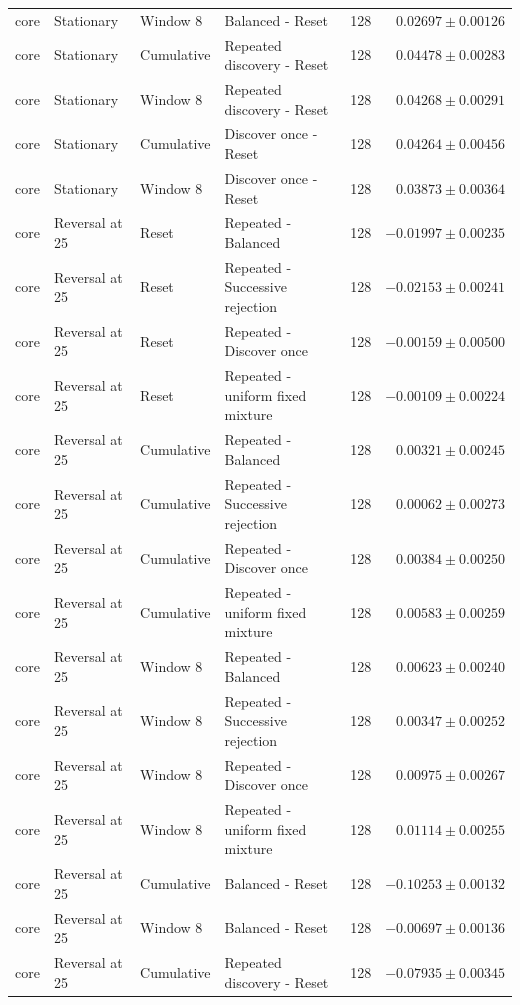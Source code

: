 \begin{longtable}{@{}lp{.19\linewidth}lp{.29\linewidth}rr@{}}
core & Stationary & Window 8 & Balanced - Reset & 128 & $0.02697 \pm 0.00126$ \\
core & Stationary & Cumulative & Repeated discovery - Reset & 128 & $0.04478 \pm 0.00283$ \\
core & Stationary & Window 8 & Repeated discovery - Reset & 128 & $0.04268 \pm 0.00291$ \\
core & Stationary & Cumulative & Discover once - Reset & 128 & $0.04264 \pm 0.00456$ \\
core & Stationary & Window 8 & Discover once - Reset & 128 & $0.03873 \pm 0.00364$ \\
core & Reversal at 25 & Reset & Repeated - Balanced & 128 & $-0.01997 \pm 0.00235$ \\
core & Reversal at 25 & Reset & Repeated - Successive rejection & 128 & $-0.02153 \pm 0.00241$ \\
core & Reversal at 25 & Reset & Repeated - Discover once & 128 & $-0.00159 \pm 0.00500$ \\
core & Reversal at 25 & Reset & Repeated - uniform fixed mixture & 128 & $-0.00109 \pm 0.00224$ \\
core & Reversal at 25 & Cumulative & Repeated - Balanced & 128 & $0.00321 \pm 0.00245$ \\
core & Reversal at 25 & Cumulative & Repeated - Successive rejection & 128 & $0.00062 \pm 0.00273$ \\
core & Reversal at 25 & Cumulative & Repeated - Discover once & 128 & $0.00384 \pm 0.00250$ \\
core & Reversal at 25 & Cumulative & Repeated - uniform fixed mixture & 128 & $0.00583 \pm 0.00259$ \\
core & Reversal at 25 & Window 8 & Repeated - Balanced & 128 & $0.00623 \pm 0.00240$ \\
core & Reversal at 25 & Window 8 & Repeated - Successive rejection & 128 & $0.00347 \pm 0.00252$ \\
core & Reversal at 25 & Window 8 & Repeated - Discover once & 128 & $0.00975 \pm 0.00267$ \\
core & Reversal at 25 & Window 8 & Repeated - uniform fixed mixture & 128 & $0.01114 \pm 0.00255$ \\
core & Reversal at 25 & Cumulative & Balanced - Reset & 128 & $-0.10253 \pm 0.00132$ \\
core & Reversal at 25 & Window 8 & Balanced - Reset & 128 & $-0.00697 \pm 0.00136$ \\
core & Reversal at 25 & Cumulative & Repeated discovery - Reset & 128 & $-0.07935 \pm 0.00345$ \\

\end{longtable}
